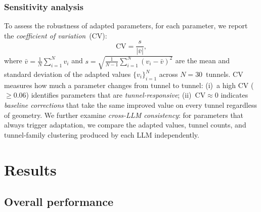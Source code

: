\documentclass[a4paper,fleqn]{cas-dc}
\begin{document}
{\subsubsection{Sensitivity analysis}\label{sec:sensitivity-method}

To assess the robustness of adapted parameters, for each parameter, we report the \emph{coefficient of variation}~(CV):
\begin{equation}\label{eq:cv}
\text{CV} = \frac{s}{\lvert\bar{v}\rvert},
\end{equation}
where $\bar{v} = \frac{1}{N}\sum_{i=1}^{N} v_i$ and $s = \sqrt{\frac{1}{N-1}\sum_{i=1}^{N}(v_i - \bar{v})^2}$ are the mean and standard deviation of the adapted values $\{v_i\}_{i=1}^{N}$ across $N = 30$~tunnels. CV measures how much a parameter changes from tunnel to tunnel: (i)~a high CV ($\geq 0.06$) identifies parameters that are \emph{tunnel-responsive}; (ii)~$\text{CV} \approx 0$ indicates \emph{baseline corrections} that take the same improved value on every tunnel regardless of geometry. We further examine \emph{cross-LLM consistency}: for parameters that always trigger adaptation, we compare the adapted values, tunnel counts, and tunnel-family clustering produced by each LLM independently.






\section{Results}\label{sec:results}

\subsection{Overall performance}\label{sec:main-results}

}
\end{document}
